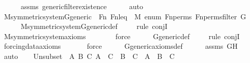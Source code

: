 \begin{isabellebody}
\ \ \ \ \isamarkupfalse%
\ assms\ generic{\isacharunderscore}{\kern0pt}filter{\isacharunderscore}{\kern0pt}existence\isanewline
\ \ \ \ \isamarkupfalse%
\ auto\isanewline
\isanewline
\ \ \isamarkupfalse%
\ M{\isacharunderscore}{\kern0pt}symmetric{\isacharunderscore}{\kern0pt}system{\isacharunderscore}{\kern0pt}G{\isacharunderscore}{\kern0pt}generic\ \ {\isachardoublequoteopen}Fn{\isachardoublequoteclose}\ {\isachardoublequoteopen}Fn{\isacharunderscore}{\kern0pt}leq{\isachardoublequoteclose}\ {\isachardoublequoteopen}{}{\isachardoublequoteclose}\ {\isachardoublequoteopen}M{\isachardoublequoteclose}\ {\isachardoublequoteopen}enum{\isachardoublequoteclose}\ {\isachardoublequoteopen}Fn{\isacharunderscore}{\kern0pt}perms{\isachardoublequoteclose}\ {\isachardoublequoteopen}Fn{\isacharunderscore}{\kern0pt}perms{\isacharunderscore}{\kern0pt}filter{\isachardoublequoteclose}\ G\ \isanewline
\ \ \ \ \isamarkupfalse%
\ M{\isacharunderscore}{\kern0pt}symmetric{\isacharunderscore}{\kern0pt}system{\isacharunderscore}{\kern0pt}G{\isacharunderscore}{\kern0pt}generic{\isacharunderscore}{\kern0pt}def\isanewline
\ \ \ \ \isamarkupfalse%
{\isacharparenleft}{\kern0pt}rule\ conjI{\isacharparenright}{\kern0pt}\isanewline
\ \ \ \ \isamarkupfalse%
\ M{\isacharunderscore}{\kern0pt}symmetric{\isacharunderscore}{\kern0pt}system{\isacharunderscore}{\kern0pt}axioms\ \isanewline
\ \ \ \ \ \isamarkupfalse%
\ force\isanewline
\ \ \ \ \isamarkupfalse%
\ G{\isacharunderscore}{\kern0pt}generic{\isacharunderscore}{\kern0pt}def\isanewline
\ \ \ \ \isamarkupfalse%
{\isacharparenleft}{\kern0pt}rule\ conjI{\isacharparenright}{\kern0pt}\isanewline
\ \ \ \ \isamarkupfalse%
\ forcing{\isacharunderscore}{\kern0pt}data{\isacharunderscore}{\kern0pt}axioms\isanewline
\ \ \ \ \ \isamarkupfalse%
\ force\isanewline
\ \ \ \ \isamarkupfalse%
\ G{\isacharunderscore}{\kern0pt}generic{\isacharunderscore}{\kern0pt}axioms{\isacharunderscore}{\kern0pt}def\isanewline
\ \ \ \ \isamarkupfalse%
\ assms\ GH\isanewline
\ \ \ \ \isamarkupfalse%
\ auto\isanewline
\isanewline
\ \ \isamarkupfalse%
\ Un{\isacharunderscore}{\kern0pt}subset\ {\isacharcolon}{\kern0pt}\ {\isachardoublequoteopen}{\isasymAnd}A\ B\ C{\isachardot}{\kern0pt}\ A\ {\isasymsubseteq}\ C\ {\isasymLongrightarrow}\ B\ {\isasymsubseteq}\ C\ {\isasymLongrightarrow}\ A\ {\isasymunion}\ B\ {\isasymsubseteq}\ C{\isachardoublequoteclose}\ \isamarkupfalse%

\end{isabellebody}
